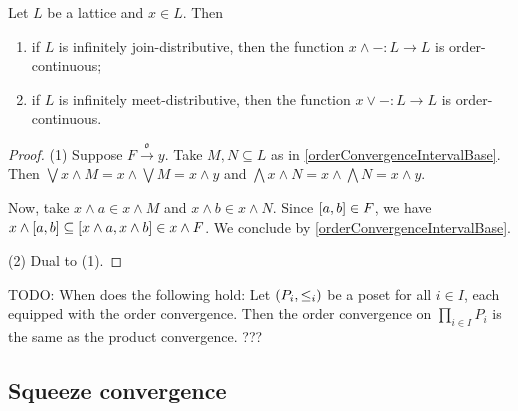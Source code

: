 \begin{proposition} \label{singleArgumentMeetJoinOrderContinuous}
Let $L$ be a lattice and $x\in L$. Then
\begin{enumerate}
\item if $L$ is infinitely join-distributive, then the function $x\wedge -: L\to L$ is order-continuous;
\item if $L$ is infinitely meet-distributive, then the function $x\vee -: L\to L$ is order-continuous.
\end{enumerate}
\end{proposition}
\begin{proof}
(1) Suppose $F\overset{\mathfrak{o}}{\longrightarrow} y$. Take $M,N\subseteq L$ as in \ref{orderConvergenceIntervalBase}. Then $\bigvee x\wedge M = x\wedge \bigvee M = x\wedge y$ and $\bigwedge x\wedge N = x\wedge \bigwedge N = x\wedge y$.

Now, take $x\wedge a \in x\wedge M$ and $x\wedge b \in x\wedge N$. Since $\interval{a, b} \in F$, we have $x\wedge \interval{a,b} \subseteq \interval{x\wedge a, x\wedge b} \in x\wedge F$. We conclude by \ref{orderConvergenceIntervalBase}.

(2) Dual to (1).
\end{proof}


TODO: When does the following hold: Let $\sSet{P_i, \leq_i}$ be a poset for all $i\in I$, each equipped with the order convergence. Then the order convergence on $\prod_{i\in I}P_i$ is the same as the product convergence. ???

\subsection{Squeeze convergence}

